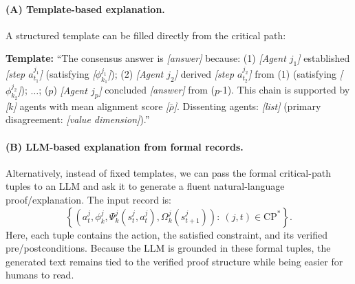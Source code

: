 \documentclass[12pt,a4paper]{article}
\newtheorem{definition}{Definition}[section]
\begin{document}
\paragraph{(A) Template-based explanation.}
A structured template can be filled directly from the critical path:
\begin{mdframed}
\textbf{Template:}
``The consensus answer is \textit{[answer]} because:
(1) \textit{[Agent $j_1$]} established \textit{[step $a^{j_1}_{t_1}$]}
(satisfying \textit{[$\phi^{j_1}_{k_1}$]});
(2) \textit{[Agent $j_2$]} derived \textit{[step $a^{j_2}_{t_2}$]} from (1)
(satisfying \textit{[$\phi^{j_2}_{k_2}$]});
$\ldots$;
($p$) \textit{[Agent $j_p$]} concluded \textit{[answer]} from ($p$-1).
This chain is supported by \textit{[$k$]} agents with mean alignment score
\textit{[$\bar{\rho}$]}. Dissenting agents: \textit{[list]}
(primary disagreement: \textit{[value dimension]}).'' 
\end{mdframed}

\paragraph{(B) LLM-based explanation from formal records.}
Alternatively, instead of fixed templates, we can pass the formal critical-path tuples
to an LLM and ask it to generate a fluent natural-language proof/explanation. The input
record is:
\begin{equation}
\left\{
\left(a_t^j,\phi_k^j,\Psi_k^j(s_t^j,a_t^j),\Omega_k^j(s_{t+1}^j)\right)
:\ (j,t)\in \mathrm{CP}^*
\right\}.
\label{eq:llm_expl_input}
\end{equation}
Here, each tuple contains the action, the satisfied constraint, and its verified
pre/postconditions. Because the LLM is grounded in these formal tuples, the generated
text remains tied to the verified proof structure while being easier for humans to read.


\end{document}
